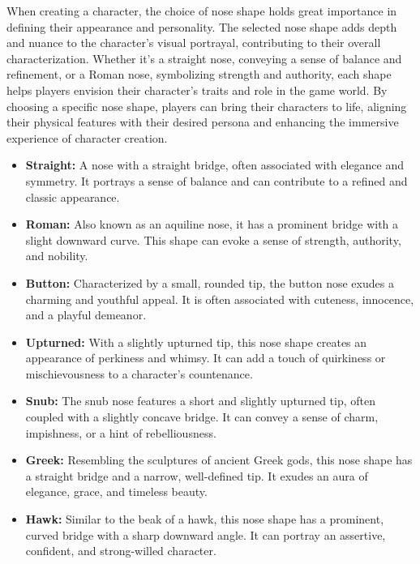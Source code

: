 \documentclass[12pt]{book}
\begin{document}
When creating a character, the choice of nose shape holds great importance in defining their appearance and personality. The selected nose shape adds depth and nuance to the character's visual portrayal, contributing to their overall characterization. Whether it's a straight nose, conveying a sense of balance and refinement, or a Roman nose, symbolizing strength and authority, each shape helps players envision their character's traits and role in the game world. By choosing a specific nose shape, players can bring their characters to life, aligning their physical features with their desired persona and enhancing the immersive experience of character creation.

\begin{itemize}
    \item \textbf{Straight:} A nose with a straight bridge, often associated with elegance and symmetry. It portrays a sense of balance and can contribute to a refined and classic appearance.

    \item \textbf{Roman:} Also known as an aquiline nose, it has a prominent bridge with a slight downward curve. This shape can evoke a sense of strength, authority, and nobility.

    \item \textbf{Button:} Characterized by a small, rounded tip, the button nose exudes a charming and youthful appeal. It is often associated with cuteness, innocence, and a playful demeanor.

    \item \textbf{Upturned:} With a slightly upturned tip, this nose shape creates an appearance of perkiness and whimsy. It can add a touch of quirkiness or mischievousness to a character's countenance.

    \item \textbf{Snub:} The snub nose features a short and slightly upturned tip, often coupled with a slightly concave bridge. It can convey a sense of charm, impishness, or a hint of rebelliousness.

    \item \textbf{Greek:} Resembling the sculptures of ancient Greek gods, this nose shape has a straight bridge and a narrow, well-defined tip. It exudes an aura of elegance, grace, and timeless beauty.

    \item \textbf{Hawk:} Similar to the beak of a hawk, this nose shape has a prominent, curved bridge with a sharp downward angle. It can portray an assertive, confident, and strong-willed character.


\end{itemize}
\end{document}
